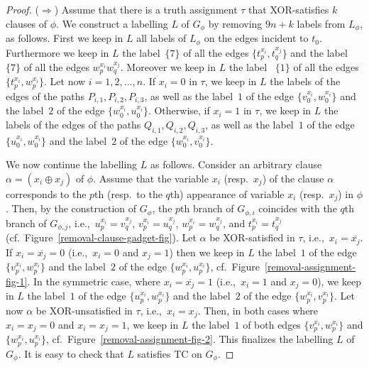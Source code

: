 \documentclass[a4paper,UKenglish]{article}
\begin{document}
\begin{proof}
($\Rightarrow $) Assume that there is a truth assignment $\tau $ that
XOR-satisfies $k$ clauses of $\phi $. We construct a labelling $L $ of $G_{\phi }$ by removing $9n+k$ labels from $L _{\phi }$, as follows.
First we keep in $L $ all labels of $L _{\phi }$ on the edges
incident to $t_{0}$. Furthermore we keep in $L $ the label~$\{7\}$ of
all the edges $  \{  t_{p}^{x_{i}} ,  t_{q}^{x_{j}}  \}  $ and the label~$\{7\}$ of all the
edges $w_{p}^{x_{i}}w_{q}^{x_{j}}$. Moreover we keep in $L $ the label~
$\{1\}$ of all the edges $  \{  t_{p}^{x_{i}}  ,  w_{p}^{x_{i}}  \}  $. Let now $i=1,2,\ldots
,n$. If $x_{i}=0$ in $\tau $, we keep in $L $ the labels of the edges
of the paths $P_{i,1},P_{i,2},P_{i,3}$, as well as the label~$1$ of the edge 
$  \{  v_{0}^{x_{i}}  ,  w_{0}^{x_{i}}  \}  $ and the label~$2$ of the edge $\{ w_{0}^{x_{i}}  ,  u_{0}^{x_{i}}  \}  $. Otherwise, if $x_{i}=1$ in $\tau $, we keep in $L $ the labels of the edges of the paths $Q_{i,1},Q_{i,2},Q_{i,3}$, as
well as the label~$1$ of the edge $  \{  u_{0}^{x_{i}}  ,  w_{0}^{x_{i}}  \}  $ and the label~$2$ of the edge $  \{  w_{0}^{x_{i}}  ,  v_{0}^{x_{i}}  \}  $.

We now continue the labelling $L $ as follows. Consider an arbitrary
clause $\alpha =(x_{i}\oplus x_{j})$ of $\phi $. Assume that the variable $x_{i}$ (resp.~$x_{j}$) of the clause $\alpha $ corresponds to the $p$th
(resp.~to the $q$th) appearance of variable $x_{i}$ (resp.~$x_{j}$) in $\phi 
$. Then, by the construction of $G_{\phi }$, the $p$th branch of $G_{\phi
,i} $ coincides with the $q$th branch of $G_{\phi ,j}$, i.e.,~$u_{p}^{x_{i}}=v_{q}^{x_{j}}$, $v_{p}^{x_{i}}=u_{q}^{x_{j}}$, $w_{p}^{x_{i}}=w_{q}^{x_{j}}$, and $t_{p}^{x_{i}}=t_{q}^{x_{j}}$ (cf.~Figure~\ref{removal-clause-gadget-fig}). Let $\alpha $ be XOR-satisfied in $\tau $,
i.e.,~$x_{i}=\overline{x_{j}}$. If $x_{i}=\overline{x_{j}}=0$ (i.e.,~$x_{i}=0$
and $x_{j}=1$) then we keep in $L $ the label~$1$ of the edge $\{  v_{p}^{x_{i}}  ,  w_{p}^{x_{i}}  \}  $ and the label~$2$ of the edge $\{  w_{p}^{x_{i}}  ,  u_{p}^{x_{i}}  \}  $, cf.~Figure~\ref{removal-assignment-fig-1}. In
the symmetric case, where $x_{i}=\overline{x_{j}}=1$ (i.e.,~$x_{i}=1$ and $x_{j}=0$), we keep in $L $ the label~$1$ of the edge $\{  u_{p}^{x_{i}}  ,  w_{p}^{x_{i}}  \}  $ and the label~$2$ of the edge $\{  w_{p}^{x_{i}}  ,  v_{p}^{x_{i}}  \}  $. Let now $\alpha $ be XOR-unsatisfied in $\tau $, i.e.,~$x_{i}=x_{j}$. Then, in both cases where $x_{i}=x_{j}=0$ and $x_{i}=x_{j}=1$, we keep in $L $ the label~$1$ of both edges $\{  v_{p}^{x_{i}}  ,  w_{p}^{x_{i}}  \}  $ and $  \{  w_{p}^{x_{i}}  ,  u_{p}^{x_{i}}  \}  $, cf.~Figure~\ref {removal-assignment-fig-2}. This finalizes the labelling $L $ of $G_{\phi }$. It is easy to check that $L $ satisfies TC on $G_{\phi }$.


\end{proof}
\end{document}
